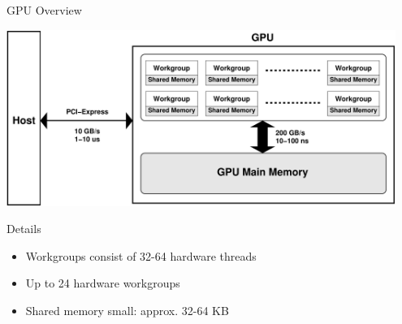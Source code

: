 \begin{frame}{GPU Overview}
 \begin{center} \includegraphics[width=0.95\textwidth]{figures/gpu-schematic} \end{center}
 
 \begin{block}{Details}
  \begin{itemize}
   \item Workgroups consist of 32-64 hardware threads
   \item Up to 24 hardware workgroups
   \item Shared memory small: approx. 32-64 KB
  \end{itemize}

 \end{block}

\end{frame}


